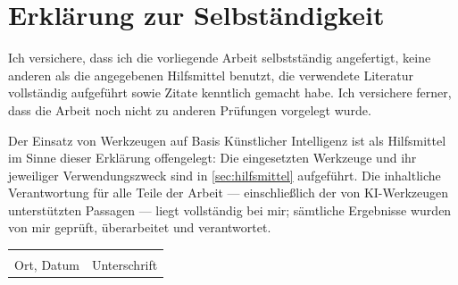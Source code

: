 \chapter{Erklärung zur Selbständigkeit}

Ich versichere, dass ich die vorliegende Arbeit selbstständig angefertigt,
keine anderen als die angegebenen Hilfsmittel benutzt, die verwendete Literatur
vollständig aufgeführt sowie Zitate kenntlich gemacht habe. Ich versichere
ferner, dass die Arbeit noch nicht zu anderen Prüfungen vorgelegt wurde.

Der Einsatz von Werkzeugen auf Basis Künstlicher Intelligenz ist als Hilfsmittel
im Sinne dieser Erklärung offengelegt: Die eingesetzten Werkzeuge und ihr
jeweiliger Verwendungszweck sind in \autoref{sec:hilfsmittel} aufgeführt. Die
inhaltliche Verantwortung für alle Teile der Arbeit — einschließlich der von
KI-Werkzeugen unterstützten Passagen — liegt vollständig bei mir; sämtliche
Ergebnisse wurden von mir geprüft, überarbeitet und verantwortet.

\vspace{2cm}

\noindent
\begin{tabular}{@{}p{7cm}p{7cm}@{}}
    \hrulefill & \hrulefill \\
    Ort, Datum & Unterschrift \\
\end{tabular}
